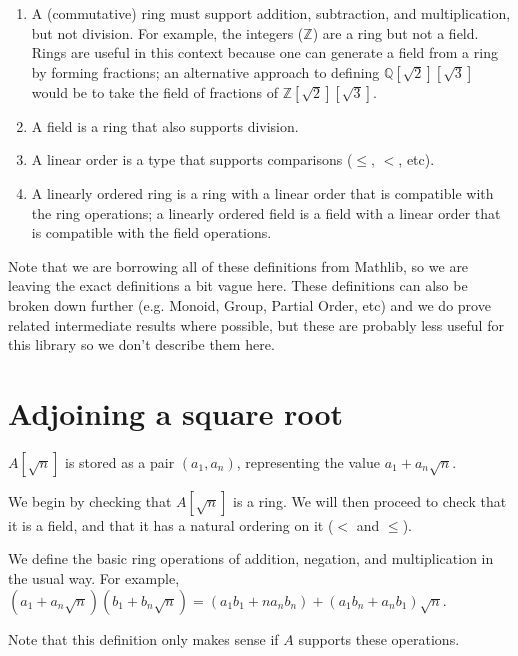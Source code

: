 \begin{enumerate}
\item A (commutative) ring must support addition, subtraction, and
multiplication, but not division. For example, the integers ($ℤ$) are a ring
but not a field. Rings are useful in this context because one can generate a
field from a ring by forming fractions; an alternative approach to defining
$ℚ[\sqrt{2}][\sqrt{3}]$ would be to take the field of fractions of
$ℤ[\sqrt{2}][\sqrt{3}]$.

\item A field is a ring that also supports division.

\item A linear order is a type that supports comparisons ($≤$, $<$, etc).

\item A linearly ordered ring is a ring with a linear order that is compatible
with the ring operations; a linearly ordered field is a field with a linear
order that is compatible with the field operations.
\end{enumerate}

Note that we are borrowing all of these definitions from Mathlib, so we are
leaving the exact definitions a bit vague here.  These definitions can also be
broken down further (e.g. Monoid, Group, Partial Order, etc) and we do prove
related intermediate results where possible, but these are probably less useful
for this library so we don't describe them here.

\section{Adjoining a square root}


\begin{definition}
  \label{def:adjoin}
  \leanok
  $A[\sqrt{n}]$ is stored as a pair $(a_1, a_n)$, representing the value
  $a_1 + a_n\sqrt{n}$.
\end{definition}

We begin by checking that $A[\sqrt{n}]$ is a ring. We will then proceed to check
that it is a field, and that it has a natural ordering on it ($<$ and $≤$).

\begin{definition}
  \label{def:adjoinRingOps}
  \leanok
  We define the basic ring operations of addition, negation, and multiplication
  in the usual way.
  For example, $(a_1 + a_n\sqrt{n})(b_1 + b_n\sqrt{n}) = (a_1b_1 + na_nb_n) + (a_1b_n + a_nb_1)\sqrt{n}$.

  Note that this definition only makes sense if $A$ supports these operations.
\end{definition}

